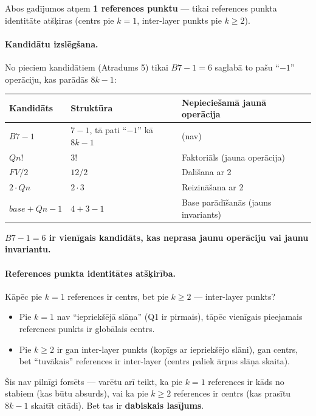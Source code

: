 \documentclass[12pt,a4paper]{article}
\begin{document}
Abos gadījumos atņem \textbf{1 references punktu} — tikai references punkta identitāte atšķiras (centrs pie $k=1$, inter-layer punkts pie $k\geq 2$).

\paragraph{Kandidātu izslēgšana.}
No pieciem kandidātiem (Atradums 5) tikai $B7 - 1 = 6$ saglabā to pašu ``$-1$'' operāciju, kas parādās $8k-1$:

\begin{table}[h]
\centering
\begin{tabular}{|l|l|l|}
\hline
\textbf{Kandidāts} & \textbf{Struktūra} & \textbf{Nepieciešamā jaunā operācija} \\
\hline
$B7 - 1$ & $7-1$, tā pati ``$-1$'' kā $8k-1$ & (nav) \\
$Qn!$ & $3!$ & Faktoriāls (jauna operācija) \\
$FV/2$ & $12/2$ & Dalīšana ar 2 \\
$2 \cdot Qn$ & $2 \cdot 3$ & Reizināšana ar 2 \\
$base + Qn - 1$ & $4+3-1$ & Base parādīšanās (jauns invariants) \\
\hline
\end{tabular}
\end{table}

\textbf{$B7 - 1 = 6$ ir vienīgais kandidāts, kas neprasa jaunu operāciju vai jaunu invariantu.}

\paragraph{References punkta identitātes atšķirība.}
Kāpēc pie $k=1$ references ir centrs, bet pie $k\geq 2$ — inter-layer punkts?

\begin{itemize}
    \item Pie $k=1$ nav ``iepriekšējā slāņa'' (Q1 ir pirmais), tāpēc vienīgais pieejamais references punkts ir globālais centrs.
    \item Pie $k\geq 2$ ir gan inter-layer punkts (kopīgs ar iepriekšējo slāni), gan centrs, bet ``tuvākais'' references ir inter-layer (centrs paliek ārpus slāņa skaita).
\end{itemize}

Šis nav pilnīgi forsēts — varētu arī teikt, ka pie $k=1$ references ir kāds no stabiem (kas būtu absurds), vai ka pie $k\geq 2$ references ir centrs (kas prasītu $8k-1$ skaitīt citādi). Bet tas ir \textbf{dabiskais lasījums}.
\end{document}
